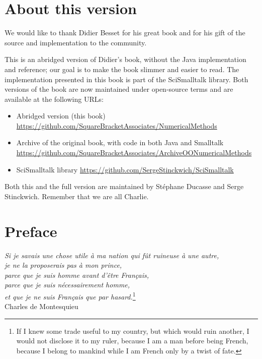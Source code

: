 \documentclass[twoside]{book}
\begin{document}
\fi


\chapter*{About this version}
We would like to thank Didier Besset for his great book and for his gift of the source and implementation to the community. 

This is an abridged version of Didier's book, without the Java implementation and reference; our goal is to make the book slimmer and easier to read.
The implementation presented in this book is part of the SciSmalltalk library.
Both versions of the book are now maintained under open-source terms and are available at the following URLs:

\begin{itemize}
\item Abridged version (this book)\\
  \url{https://github.com/SquareBracketAssociates/NumericalMethods}
\item Archive of the original book, with code in both Java and Smalltalk\\
  \url{https://github.com/SquareBracketAssociates/ArchiveOONumericalMethods}
\item SciSmalltalk library
  \url{https://github.com/SergeStinckwich/SciSmalltalk}
\end{itemize}

Both this and the full version are maintained by St\'ephane Ducasse and Serge Stinckwich.
Remember that we are all Charlie.

\bigskip
{}

\chapter*{Preface}

\begin{flushright} {\sl Si je savais une chose
utile \`{a} ma nation qui f\^{u}t ruineuse \`{a} une autre,\\je ne
la proposerais pas \`{a} mon prince,\\parce que je suis homme
avant d'\^etre Fran\c cais,\\parce que je suis n\'ecessairement
homme,\\et que je ne suis Fran\c cais que par hasard.}\footnote{If I
knew some trade useful to my country, but which would ruin
another, I would not disclose it to my ruler, because I am a man
before being French, because I belong to mankind while I am French
only by a twist of fate.}\\ Charles de Montesquieu
\end{flushright}
\end{document}
